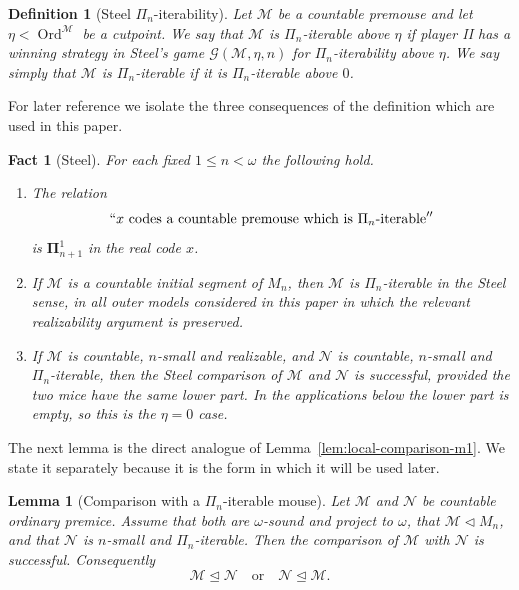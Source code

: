 \documentclass[a4paper,11pt]{article}
\newtheorem{lemma}[theorem]{Lemma}
\newtheorem{definition}[theorem]{Definition}
\newtheorem{fact}[theorem]{Fact}
\begin{document}
\begin{definition}[Steel $\Pi_n$-iterability]\label{def:pin-iterability}
Let $\mathcal M$ be a countable premouse and let $\eta<\operatorname{Ord}^{\mathcal M}$ be a cutpoint.  We say that $\mathcal M$ is \emph{$\Pi_n$-iterable above $\eta$} if player II has a winning strategy in Steel's game $\mathcal G(\mathcal M,\eta,n)$ for $\Pi_n$-iterability above $\eta$.  We say simply that $\mathcal M$ is \emph{$\Pi_n$-iterable} if it is $\Pi_n$-iterable above $0$.
\end{definition}

For later reference we isolate the three consequences of the definition which are used in this paper.

\begin{fact}[Steel]\label{fact:steel-pin-iterability}
For each fixed $1\leq n<\omega$ the following hold.
\begin{enumerate}
   \item The relation
   \[
      ``x\text{ codes a countable premouse which is }\Pi_n\text{-iterable}''
   \]
   is $\boldsymbol\Pi^1_{n+1}$ in the real code $x$.
   \item If $\mathcal M$ is a countable initial segment of $M_n$, then $\mathcal M$ is $\Pi_n$-iterable in the Steel sense, in all outer models considered in this paper in which the relevant realizability argument is preserved.
   \item If $\mathcal M$ is countable, $n$-small and realizable, and $\mathcal N$ is countable, $n$-small and $\Pi_n$-iterable, then the Steel comparison of $\mathcal M$ and $\mathcal N$ is successful, provided the two mice have the same lower part.  In the applications below the lower part is empty, so this is the $\eta=0$ case.
\end{enumerate}
\end{fact}

The next lemma is the direct analogue of Lemma~\ref{lem:local-comparison-m1}.  We state it separately because it is the form in which it will be used later.

\begin{lemma}[Comparison with a $\Pi_n$-iterable mouse]\label{lem:local-comparison-mn}
Let $\mathcal M$ and $\mathcal N$ be countable ordinary premice.  Assume that both are $\omega$-sound and project to $\omega$, that $\mathcal M\triangleleft M_n$, and that $\mathcal N$ is $n$-small and $\Pi_n$-iterable.  Then the comparison of $\mathcal M$ with $\mathcal N$ is successful.  Consequently
\[
   \mathcal M\trianglelefteq\mathcal N
   \quad\text{or}\quad
   \mathcal N\trianglelefteq\mathcal M .
\]
\end{lemma}
\end{document}
